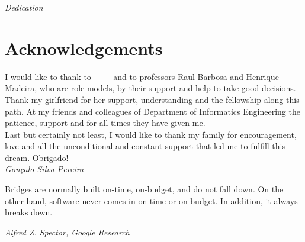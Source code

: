 
\pagestyle{empty}
\begin{center}

\emph{Dedication}

\end{center}



\newpage
\pagestyle{fancy}
\section*{Acknowledgements}

I would like to thank to ------ and to professors Raul Barbosa and Henrique Madeira, who are role models, by their support and help to take good decisions.\\

Thank my girlfriend for her support, understanding and the fellowship along this path. At my friends and colleagues of Department of Informatics Engineering the patience, support and for all times they have given me. \\

Last but certainly not least, I would like to thank my family for encouragement, love and all the unconditional and constant support that led me to fulfill this dream. Obrigado!\\



\emph{\hfill Gonçalo Silva Pereira}

\clearpage

\vspace*{\fill}
\pagestyle{empty}

\begin{shadequote}
Bridges are normally built on-time, on-budget, and do not
fall down. On the other hand, software never comes in on-time
or on-budget. In addition, it always breaks down.\par\emph{Alfred Z. Spector, Google Research}
\end{shadequote}

